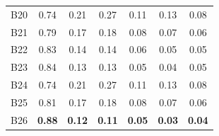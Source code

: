 \documentclass{article}
\theoremstyle{plain}
\theoremstyle{definition}
\theoremstyle{remark}
\begin{document}
\begin{table}[h!]
{\begin{tabular}{lcccccc}
      B20                                 &
      0.74                                &
      0.21                                &
      0.27                                &
      0.11                                &
      0.13                                &
      0.08                                  \\

      B21                                 &
      0.79                                &
      0.17                                &
      0.18                                &
      0.08                                &
      0.07                                &
      0.06                                  \\

      B22                                 &
      0.83                                &
      0.14                                &
      0.14                                &
      0.06                                &
      0.05                                &
      0.05                                  \\

      B23                                 &
      0.84                                &
      0.13                                &
      0.13                                &
      0.05                                &
      0.04                                &
      0.05                                  \\

      B24                                 &
      0.74                                &
      0.21                                &
      0.27                                &
      0.11                                &
      0.13                                &
      0.08                                  \\

      B25                                 &
      0.81                                &
      0.17                                &
      0.18                                &
      0.08                                &
      0.07                                &
      0.06                                  \\

      B26                                 &
      \textbf{0.88}                       &
      \textbf{0.12}                       &
      \textbf{0.11}                       &
      \textbf{0.05}                       &
      \textbf{0.03}                       &
      \textbf{0.04}                         \\


\end{tabular}}
\end{table}
\end{document}
